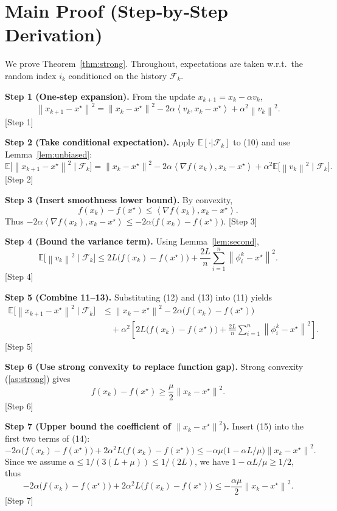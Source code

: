 \documentclass{article}
\newcommand{\E}{\mathbb{E}}
\newcommand{\norm}[1]{\left\|#1\right\|}
\newcommand{\ip}[2]{\left\langle #1,#2\right\rangle}
\begin{document}
\section*{Main Proof (Step‑by‑Step Derivation)}
We prove Theorem~\ref{thm:strong}.  Throughout, expectations are taken w.r.t.\ the random index $i_k$ conditioned on the history $\mathcal{F}_k$.

\noindent\textbf{Step 1 (One‑step expansion).}  
From the update $x_{k+1}=x_k-\alpha v_k$,
\[
\norm{x_{k+1}-x^{\star}}^{2}
= \norm{x_k-x^{\star}}^{2}
   -2\alpha\ip{v_k}{x_k-x^{\star}}
   +\alpha^{2}\norm{v_k}^{2}.
\tag{10}
\]
[Step 1]

\noindent\textbf{Step 2 (Take conditional expectation).}  
Apply $\E[\cdot|\mathcal{F}_k]$ to (10) and use Lemma~\ref{lem:unbiased}:
\[
\E\!\bigl[\norm{x_{k+1}-x^{\star}}^{2}\mid\mathcal{F}_k\bigr]
= \norm{x_k-x^{\star}}^{2}
   -2\alpha\ip{\nabla f(x_k)}{x_k-x^{\star}}
   +\alpha^{2}\E\!\bigl[\norm{v_k}^{2}\mid\mathcal{F}_k\bigr].
\tag{11}
\]
[Step 2]

\noindent\textbf{Step 3 (Insert smoothness lower bound).}  
By convexity,
\[
f(x_k)-f(x^{\star})\le \ip{\nabla f(x_k)}{x_k-x^{\star}} .
\tag{12}
\]
Thus $-2\alpha\ip{\nabla f(x_k)}{x_k-x^{\star}}\le -2\alpha\bigl(f(x_k)-f(x^{\star})\bigr)$.  
[Step 3]

\noindent\textbf{Step 4 (Bound the variance term).}  
Using Lemma~\ref{lem:second},
\[
\E\!\bigl[\norm{v_k}^{2}\mid\mathcal{F}_k\bigr]
\le 2L\bigl(f(x_k)-f(x^{\star})\bigr)
   +\frac{2L}{n}\sum_{i=1}^{n}\norm{\phi_i^{k}-x^{\star}}^{2}.
\tag{13}
\]
[Step 4]

\noindent\textbf{Step 5 (Combine 11–13).}  
Substituting (12) and (13) into (11) yields
\[
\begin{aligned}
\E\!\bigl[\norm{x_{k+1}-x^{\star}}^{2}\mid\mathcal{F}_k\bigr]
&\le \norm{x_k-x^{\star}}^{2}
   -2\alpha\bigl(f(x_k)-f(x^{\star})\bigr) \\
&\quad +\alpha^{2}\!\left[2L\bigl(f(x_k)-f(x^{\star})\bigr)
   +\frac{2L}{n}\sum_{i=1}^{n}\norm{\phi_i^{k}-x^{\star}}^{2}\right].
\end{aligned}
\tag{14}
\]
[Step 5]

\noindent\textbf{Step 6 (Use strong convexity to replace function gap).}  
Strong convexity (\ref{as:strong}) gives
\[
f(x_k)-f(x^{\star}) \ge \frac{\mu}{2}\norm{x_k-x^{\star}}^{2}.
\tag{15}
\]
[Step 6]

\noindent\textbf{Step 7 (Upper bound the coefficient of $\norm{x_k-x^{\star}}^{2}$).}  
Insert (15) into the first two terms of (14):
\[
-2\alpha\bigl(f(x_k)-f(x^{\star})\bigr)
   +2\alpha^{2}L\bigl(f(x_k)-f(x^{\star})\bigr)
\le -\alpha\mu\bigl(1-\alpha L/\mu\bigr)\norm{x_k-x^{\star}}^{2}.
\tag{16}
\]
Since we assume $\alpha\le 1/(3(L+\mu))\le 1/(2L)$, we have $1-\alpha L/\mu\ge 1/2$, thus
\[
-2\alpha\bigl(f(x_k)-f(x^{\star})\bigr)
   +2\alpha^{2}L\bigl(f(x_k)-f(x^{\star})\bigr)
\le -\frac{\alpha\mu}{2}\norm{x_k-x^{\star}}^{2}.
\tag{17}
\]
[Step 7]
\end{document}
